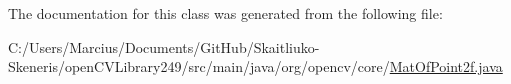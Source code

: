 The documentation for this class was generated from the following file\+:\begin{DoxyCompactItemize}
\item 
C\+:/\+Users/\+Marcius/\+Documents/\+Git\+Hub/\+Skaitliuko-\/\+Skeneris/open\+C\+V\+Library249/src/main/java/org/opencv/core/\mbox{\hyperlink{_mat_of_point2f_8java}{Mat\+Of\+Point2f.\+java}}\end{DoxyCompactItemize}
